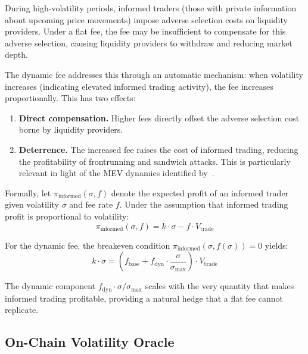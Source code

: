 During high-volatility periods, informed traders (those with private
information about upcoming price movements) impose adverse selection costs on
liquidity providers. Under a flat fee, the fee may be insufficient to
compensate for this adverse selection, causing liquidity providers to withdraw
and reducing market depth.

The dynamic fee addresses this through an automatic mechanism: when volatility
increases (indicating elevated informed trading activity), the fee increases
proportionally. This has two effects:

\begin{enumerate}
  \item \textbf{Direct compensation.} Higher fees directly offset the adverse
    selection cost borne by liquidity providers.
  \item \textbf{Deterrence.} The increased fee raises the cost of informed
    trading, reducing the profitability of frontrunning and sandwich attacks.
    This is particularly relevant in light of the MEV dynamics identified
    by~\citet{daian2020flash}.
\end{enumerate}

Formally, let $\pi_{\text{informed}}(\sigma, f)$ denote the expected profit
of an informed trader given volatility $\sigma$ and fee rate $f$. Under the
assumption that informed trading profit is proportional to volatility:
\begin{equation}
  \pi_{\text{informed}}(\sigma, f) = k \cdot \sigma - f \cdot V_{\text{trade}}
  \label{eq:informed-profit}
\end{equation}

For the dynamic fee, the breakeven condition
$\pi_{\text{informed}}(\sigma, f(\sigma)) = 0$ yields:
\begin{equation}
  k \cdot \sigma = \left(f_{\text{base}} + f_{\text{dyn}} \cdot \frac{\sigma}{\sigma_{\max}}\right) \cdot V_{\text{trade}}
  \label{eq:breakeven}
\end{equation}

The dynamic component $f_{\text{dyn}} \cdot \sigma / \sigma_{\max}$ scales
with the very quantity that makes informed trading profitable, providing a
natural hedge that a flat fee cannot replicate.

\subsection{On-Chain Volatility Oracle}
\label{subsec:vol-oracle}

